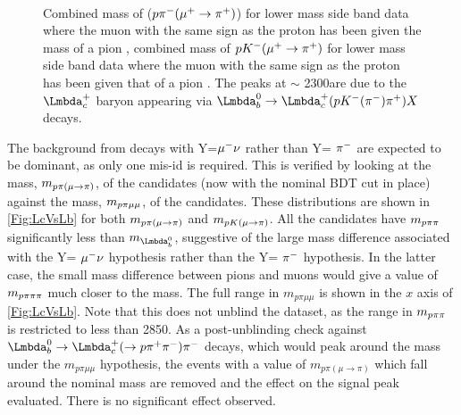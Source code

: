 \begin{figure}[!t]\def\nh{0.33\textwidth}

  \centering
  
  \textwidth\\
  \textwidth  

  
  \caption{ Combined mass of ($p{{\pi}^-}({\mu^+}\rightarrow{\ensuremath{{\pi}^+}})$) for \Lbpi lower mass side band data where the muon with the same sign as the proton has been given the mass of a pion \protect{}, combined mass of $p{{K}^-}({\mu^+}\rightarrow{\ensuremath{{\pi}^+}})$ for \LbK lower mass side band data where the muon with the same sign as the proton has been given that of a pion \protect{}. The peaks at $\sim$ 2300\mevcc are due to the $\Lc$ baryon appearing via $\Lb\to\Lc(p\Km(\pim)\pip)X$ decays.}
  \label{Fig:Lcpeak}  

\end{figure}
The background from decays with Y=${\mu^-}\nu$ rather than Y= ${{\pi}^-}$ are expected to be dominant, as only one mis-id is required. This is verified by looking at the  mass, $m_{{p}\pi(\mu\rightarrow\pi)}$, of the \Lc candidates (now with the nominal BDT cut in place) against the mass, $m_{{p}\pi\mu\mu}$, of the \Lb candidates. These distributions are shown in \autoref{Fig:LcVsLb} for both $m_{{p}\pi(\mu\rightarrow\pi)}$ and $m_{{p}{K}(\mu\rightarrow\pi)}$. All the \Lc candidates have $m_{{p}\pi\pi}$ significantly less than $m_{\Lb}$, suggestive of the large mass difference associated with the Y= ${\mu^-}\nu$ hypothesis rather than the Y= ${{\pi}^-}$ hypothesis. In the latter case, the small mass difference between pions and muons would give a value of $m_{{p}\pi\pi\pi}$ much closer to the \Lb mass. The full range in $m_{p\pi\mu\mu}$ is shown in the $x$ axis of \autoref{Fig:LcVsLb}\protect{}. Note that this does not unblind the \Lbpi dataset, as the range in $m_{{p}\pi\pi}$ is restricted to less than 2850\mevcc. %
As a post-unblinding check against $\Lb \to \Lc (\to \proton \pip \pim) \pim$ decays, which would peak around the \Lb mass under the $m_{p\pi\mu\mu}$ hypothesis, the events with a value of $m_{p\pi(\mu\to\pi)}$ which fall around the nominal \Lc mass are removed and the effect on the \Lbpi signal peak evaluated. There is no significant effect observed. %


